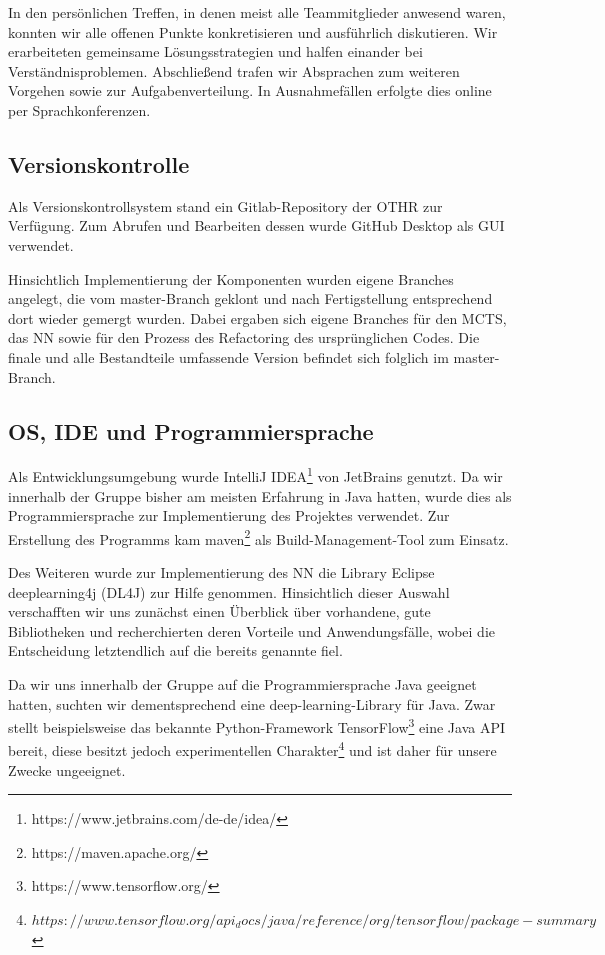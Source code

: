 \documentclass[12pt,a4paper]{article}
\begin{document}
In den persönlichen Treffen, in denen meist alle Teammitglieder anwesend waren, konnten wir alle offenen Punkte konkretisieren und ausführlich diskutieren. Wir erarbeiteten gemeinsame Lösungsstrategien und halfen einander bei Verständnisproblemen. Abschließend trafen wir Absprachen zum weiteren Vorgehen sowie zur Aufgabenverteilung. In Ausnahmefällen erfolgte dies online per Sprachkonferenzen.

\subsection{Versionskontrolle}
Als Versionskontrollsystem stand ein Gitlab-Repository der OTHR zur Verfügung. Zum Abrufen und Bearbeiten dessen wurde GitHub Desktop als GUI verwendet.

Hinsichtlich Implementierung der Komponenten wurden eigene Branches angelegt, die vom master-Branch geklont und nach Fertigstellung entsprechend dort wieder gemergt wurden. Dabei ergaben sich eigene Branches für den MCTS, das NN sowie für den Prozess des Refactoring des ursprünglichen Codes. Die finale und alle Bestandteile umfassende Version befindet sich folglich im master-Branch.

\subsection{OS, IDE und Programmiersprache}
Als Entwicklungsumgebung wurde IntelliJ IDEA\footnote{https://www.jetbrains.com/de-de/idea/} von JetBrains genutzt. Da wir innerhalb der Gruppe bisher am meisten Erfahrung in Java hatten, wurde dies als Programmiersprache zur Implementierung des Projektes verwendet. Zur Erstellung des Programms kam maven\footnote{https://maven.apache.org/} als Build-Management-Tool zum Einsatz.

Des Weiteren wurde zur Implementierung des NN die Library Eclipse deeplearning4j (DL4J) \cite{DL4J} zur Hilfe genommen. Hinsichtlich dieser Auswahl verschafften wir uns zunächst einen Überblick über vorhandene, gute Bibliotheken und recherchierten deren Vorteile und Anwendungsfälle, wobei die Entscheidung letztendlich auf die bereits genannte fiel.

Da wir uns innerhalb der Gruppe auf die Programmiersprache Java geeignet hatten, suchten wir dementsprechend eine deep-learning-Library für Java. Zwar stellt beispielsweise das bekannte Python-Framework TensorFlow\footnote{https://www.tensorflow.org/} eine Java API bereit, diese besitzt jedoch experimentellen Charakter\footnote{$https://www.tensorflow.org/api_docs/java/reference/org/tensorflow/package-summary$} und ist daher für unsere Zwecke ungeeignet. 
\end{document}
